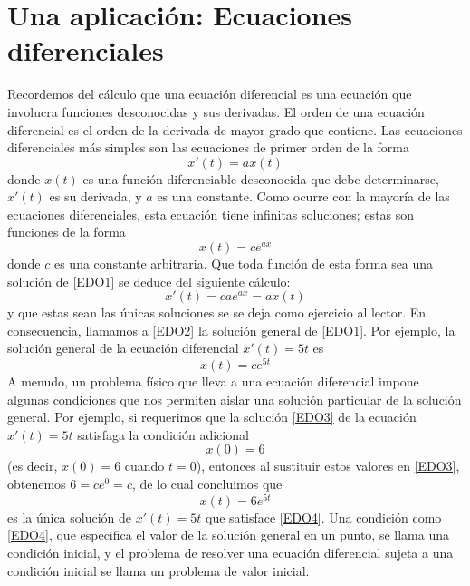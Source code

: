 \newpage

\section{Una aplicación: Ecuaciones diferenciales}



Recordemos del cálculo que una ecuación diferencial es una ecuación que involucra funciones desconocidas y sus derivadas. El orden de una ecuación diferencial es el orden de la derivada de mayor grado que contiene. Las ecuaciones diferenciales más simples son las ecuaciones de primer orden de la forma
\begin{equation}
    x'(t) = ax(t) \label{EDO1}
\end{equation}
donde $x(t)$ es una función diferenciable desconocida que debe determinarse, $x'(t)$ es su derivada, y $a$ es una constante. Como ocurre con la mayoría de las ecuaciones diferenciales, esta ecuación tiene infinitas soluciones; estas son funciones de la forma
\begin{equation}
    x(t) = ce^{ax} \label{EDO2}
\end{equation}
donde $c$ es una constante arbitraria. Que toda función de esta forma sea una solución de \eqref{EDO1} se deduce del siguiente cálculo:
$$x'(t) = cae^{ax} = ax(t)$$
y que estas sean las únicas soluciones se se deja como ejercicio al lector. En consecuencia, llamamos a \eqref{EDO2} la solución general de \eqref{EDO1}. Por ejemplo, la solución general de la ecuación diferencial $x'(t) = 5t$ es
\begin{equation}
   x(t) = ce^{5t} \label{EDO3}
\end{equation}
A menudo, un problema físico que lleva a una ecuación diferencial impone algunas condiciones que nos permiten aislar una solución particular de la solución general. Por ejemplo, si requerimos que la solución \eqref{EDO3} de la ecuación $x'(t) = 5t$ satisfaga la condición adicional
\begin{equation}
    x(0) = 6 \label{EDO4}
\end{equation}
(es decir, $x(0) = 6$ cuando $t = 0$), entonces al sustituir estos valores en \eqref{EDO3}, obtenemos $6 = ce^0 = c$, de lo cual concluimos que
$$x(t) = 6e^{5t}$$
es la única solución de $x'(t) = 5t$ que satisface \eqref{EDO4}. Una condición como \eqref{EDO4}, que especifica el valor de la solución general en un punto, se llama una condición inicial, y el problema de resolver una ecuación diferencial sujeta a una condición inicial se llama un problema de valor inicial.

